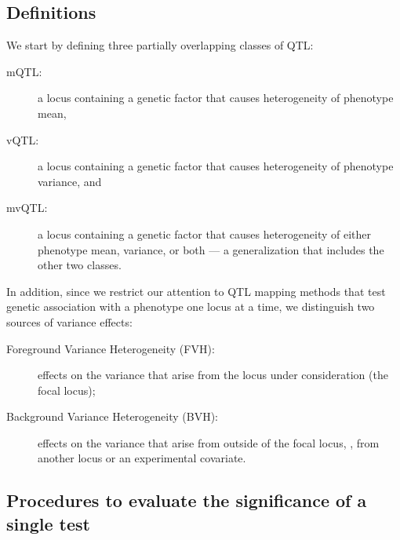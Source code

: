 \subsection{Definitions}

  We start by defining three partially overlapping classes of QTL:
  \begin{description}
      \item[mQTL:] a locus containing a genetic factor that causes heterogeneity of phenotype mean,
      \item[vQTL:] a locus containing a genetic factor that causes heterogeneity of phenotype variance, and
      \item[mvQTL:] a locus containing a genetic factor that causes heterogeneity of either phenotype mean, variance, or both --- a generalization that includes the other two classes.
  \end{description}
  In addition, since we restrict our attention to QTL mapping methods that test genetic association with a phenotype one locus at a time, we distinguish two sources of variance effects:
  \begin{description}
    \item[Foreground Variance Heterogeneity (FVH):] effects on the variance that arise from the locus under consideration (the focal locus);
    \item[Background Variance Heterogeneity (BVH):] effects on the variance that arise from outside of the focal locus, \eg, from another locus or an experimental covariate.
  \end{description}


\subsection{Procedures to evaluate the significance of a single test}

